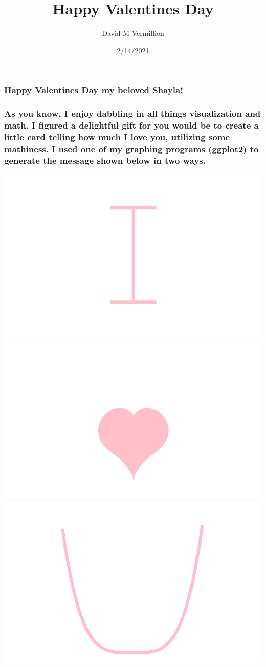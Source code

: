 \documentclass[
]{article}
\title{Happy Valentines Day}
\author{David M Vermillion}
\date{2/14/2021}
\begin{document}
\maketitle

\hypertarget{happy-valentines-day-my-beloved-shayla}{%
\subsubsection{Happy Valentines Day my beloved
Shayla!}\label{happy-valentines-day-my-beloved-shayla}}

\hypertarget{as-you-know-i-enjoy-dabbling-in-all-things-visualization-and-math.-i-figured-a-delightful-gift-for-you-would-be-to-create-a-little-card-telling-how-much-i-love-you-utilizing-some-mathiness.-i-used-one-of-my-graphing-programs-ggplot2-to-generate-the-message-shown-below-in-two-ways.}{%
\subsubsection{As you know, I enjoy dabbling in all things visualization
and math. I figured a delightful gift for you would be to create a
little card telling how much I love you, utilizing some mathiness. I
used one of my graphing programs (ggplot2) to generate the message shown
below in two
ways.}\label{as-you-know-i-enjoy-dabbling-in-all-things-visualization-and-math.-i-figured-a-delightful-gift-for-you-would-be-to-create-a-little-card-telling-how-much-i-love-you-utilizing-some-mathiness.-i-used-one-of-my-graphing-programs-ggplot2-to-generate-the-message-shown-below-in-two-ways.}}

\includegraphics[width=0.3\linewidth]{I}
\includegraphics[width=0.3\linewidth]{Heart2}
\includegraphics[width=0.3\linewidth]{U}
\end{document}
